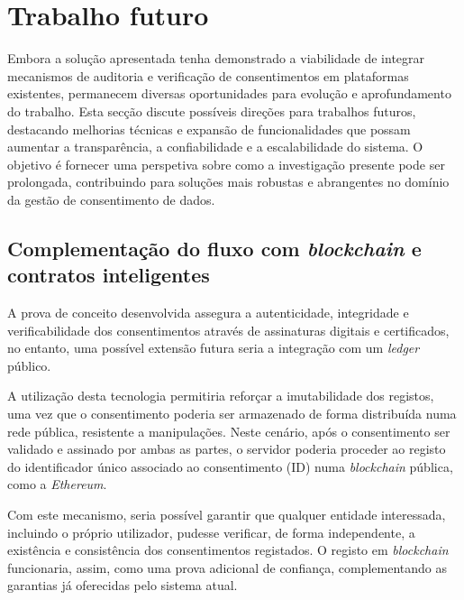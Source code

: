 
\section{Trabalho futuro}

Embora a solução apresentada tenha demonstrado a viabilidade de integrar mecanismos de auditoria e verificação de consentimentos em plataformas existentes, permanecem diversas oportunidades para evolução e aprofundamento do trabalho. Esta secção discute possíveis direções para trabalhos futuros, destacando melhorias técnicas e expansão de funcionalidades que possam aumentar a transparência, a confiabilidade e a escalabilidade do sistema. O objetivo é fornecer uma perspetiva sobre como a investigação presente pode ser prolongada, contribuindo para soluções mais robustas e abrangentes no domínio da gestão de consentimento de dados.

\subsection{Complementação do fluxo com \textit{blockchain} e contratos inteligentes}

A prova de conceito desenvolvida assegura a autenticidade, integridade e verificabilidade dos consentimentos através de assinaturas digitais e certificados, no entanto, uma possível extensão futura seria a integração com um \textit{ledger} público.

A utilização desta tecnologia permitiria reforçar a imutabilidade dos registos, uma vez que o consentimento poderia ser armazenado de forma distribuída numa rede pública, resistente a manipulações. Neste cenário, após o consentimento ser validado e assinado por ambas as partes, o servidor poderia proceder ao registo do identificador único associado ao consentimento (ID) numa \textit{blockchain} pública, como a \textit{Ethereum}.

Com este mecanismo, seria possível garantir que qualquer entidade interessada, incluindo o próprio utilizador, pudesse verificar, de forma independente, a existência e consistência dos consentimentos registados. O registo em \textit{blockchain} funcionaria, assim, como uma prova adicional de confiança, complementando as garantias já oferecidas pelo sistema atual.  

